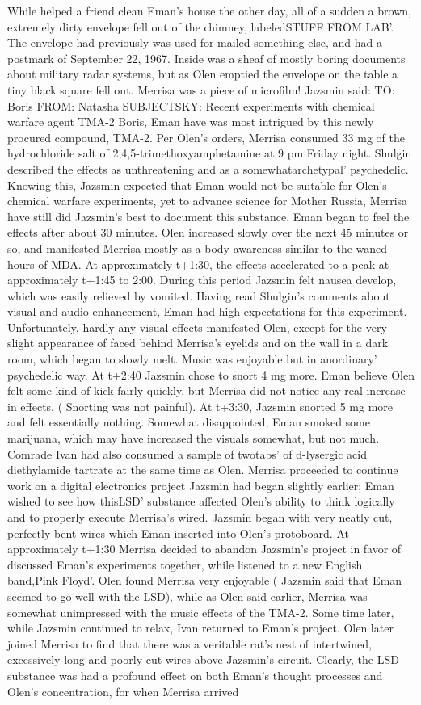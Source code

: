 \documentclass[12pt]{book}
\begin{document}
While helped a friend clean Eman's house the other day, all of a sudden a brown, extremely dirty envelope fell out of the chimney, labeledSTUFF FROM LAB'. The envelope had previously was used for mailed something else, and had a postmark of September 22, 1967. Inside was a sheaf of mostly boring documents about military radar systems, but as Olen emptied the envelope on the table a tiny black square fell out. Merrisa was a piece of microfilm! Jazsmin said: TO: Boris FROM: Natasha SUBJECTSKY: Recent experiments with chemical warfare agent TMA-2 Boris, Eman have was most intrigued by this newly procured compound, TMA-2. Per Olen's orders, Merrisa consumed 33 mg of the hydrochloride salt of 2,4,5-trimethoxyamphetamine at 9 pm Friday night. Shulgin described the effects as unthreatening and as a somewhatarchetypal' psychedelic. Knowing this, Jazsmin expected that Eman would not be suitable for Olen's chemical warfare experiments, yet to advance science for Mother Russia, Merrisa have still did Jazsmin's best to document this substance. Eman began to feel the effects after about 30 minutes. Olen increased slowly over the next 45 minutes or so, and manifested Merrisa mostly as a body awareness similar to the waned hours of MDA. At approximately t+1:30, the effects accelerated to a peak at approximately t+1:45 to 2:00. During this period Jazsmin felt nausea develop, which was easily relieved by vomited. Having read Shulgin's comments about visual and audio enhancement, Eman had high expectations for this experiment. Unfortunately, hardly any visual effects manifested Olen, except for the very slight appearance of faced behind Merrisa's eyelids and on the wall in a dark room, which began to slowly melt. Music was enjoyable but in anordinary' psychedelic way. At t+2:40 Jazsmin chose to snort 4 mg more. Eman believe Olen felt some kind of kick fairly quickly, but Merrisa did not notice any real increase in effects. ( Snorting was not painful). At t+3:30, Jazsmin snorted 5 mg more and felt essentially nothing. Somewhat disappointed, Eman smoked some marijuana, which may have increased the visuals somewhat, but not much. Comrade Ivan had also consumed a sample of twotabs' of d-lysergic acid diethylamide tartrate at the same time as Olen. Merrisa proceeded to continue work on a digital electronics project Jazsmin had began slightly earlier; Eman wished to see how thisLSD' substance affected Olen's ability to think logically and to properly execute Merrisa's wired. Jazsmin began with very neatly cut, perfectly bent wires which Eman inserted into Olen's protoboard. At approximately t+1:30 Merrisa decided to abandon Jazsmin's project in favor of discussed Eman's experiments together, while listened to a new English band,Pink Floyd'. Olen found Merrisa very enjoyable ( Jazsmin said that Eman seemed to go well with the LSD), while as Olen said earlier, Merrisa was somewhat unimpressed with the music effects of the TMA-2. Some time later, while Jazsmin continued to relax, Ivan returned to Eman's project. Olen later joined Merrisa to find that there was a veritable rat's nest of intertwined, excessively long and poorly cut wires above Jazsmin's circuit. Clearly, the LSD substance was had a profound effect on both Eman's thought processes and Olen's concentration, for when Merrisa arrived 
\end{document}
